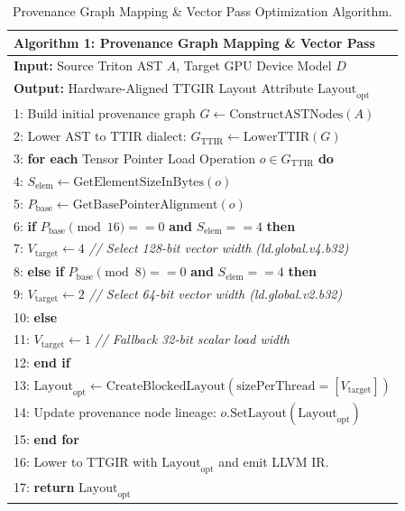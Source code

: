\documentclass[10pt,journal,compsoc]{IEEEtran}
\begin{document}
\begin{table}[htbp]
\centering
\caption{Provenance Graph Mapping \& Vector Pass Optimization Algorithm.}
\label{alg:provenance}
\small
\begin{tabular}{p{}}
\toprule
\textbf{Algorithm 1: Provenance Graph Mapping \& Vector Pass} \\
\midrule
\textbf{Input:} Source Triton AST $A$, Target GPU Device Model $D$ \\
\textbf{Output:} Hardware-Aligned TTGIR Layout Attribute $\text{Layout}_{\text{opt}}$ \\
\midrule
1: Build initial provenance graph $G \leftarrow \text{ConstructASTNodes}(A)$\\
2: Lower AST to TTIR dialect: $G_{\text{TTIR}} \leftarrow \text{LowerTTIR}(G)$\\
3: \textbf{for each} Tensor Pointer Load Operation $o \in G_{\text{TTIR}}$ \textbf{do}\\
4: \quad $S_{\text{elem}} \leftarrow \text{GetElementSizeInBytes}(o)$\\
5: \quad $P_{\text{base}} \leftarrow \text{GetBasePointerAlignment}(o)$\\
6: \quad \textbf{if} $P_{\text{base}} \pmod{16} == 0$ \textbf{and} $S_{\text{elem}} == 4$ \textbf{then}\\
7: \quad\quad $V_{\text{target}} \leftarrow 4$ \quad \textit{// Select 128-bit vector width (ld.global.v4.b32)}\\
8: \quad \textbf{else if} $P_{\text{base}} \pmod{8} == 0$ \textbf{and} $S_{\text{elem}} == 4$ \textbf{then}\\
9: \quad\quad $V_{\text{target}} \leftarrow 2$ \quad \textit{// Select 64-bit vector width (ld.global.v2.b32)}\\
10: \quad \textbf{else}\\
11: \quad\quad $V_{\text{target}} \leftarrow 1$ \quad \textit{// Fallback 32-bit scalar load width}\\
12: \quad \textbf{end if}\\
13: \quad $\text{Layout}_{\text{opt}} \leftarrow \text{CreateBlockedLayout}(\text{sizePerThread}=[V_{\text{target}}])$\\
14: \quad Update provenance node lineage: $o.\text{SetLayout}(\text{Layout}_{\text{opt}})$\\
15: \textbf{end for}\\
16: Lower to TTGIR with $\text{Layout}_{\text{opt}}$ and emit LLVM IR.\\
17: \textbf{return} $\text{Layout}_{\text{opt}}$\\
\bottomrule
\end{tabular}
\end{table}
\end{document}
